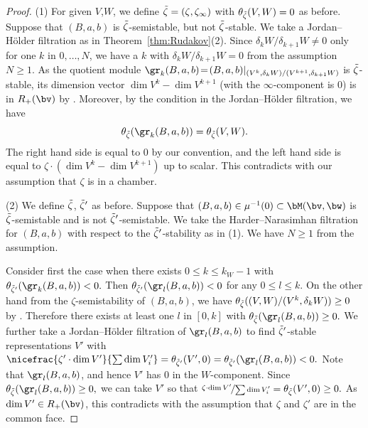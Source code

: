 \begin{proof}
(1) For given $V$,$W$, we def\/ine $\Tilde\zeta=(\zeta,\zeta_\infty)$
with $\theta_{\Tilde\zeta}(V,W) = 0$ as before.
%
Suppose that $(B,a,b)$ is $\Tilde\zeta$-semistable, but not
$\Tilde\zeta$-stable. We take a Jordan--H\"older f\/iltration as in
Theo\-rem~\ref{thm:Rudakov}(2). Since $\delta_k W/\delta_{k+1} W \neq 0$ only
for one $k$ in $0,\dots, N$, we have a $k$ with $\delta_k
W/\delta_{k+1} W = 0$ from the assumption $N\ge 1$. As the quotient
module $\gr_k(B,a,b)\! =\! (B,a,b)|_{(V^k,\delta_k
  W)/\linebreak[2](V^{k+1}, \delta_{k+1} W)}$ is
$\Tilde\zeta$-stable, its dimension vector $\dim V^k - \dim V^{k+1}$
(with the $\infty$-component is $0$) is in $R_+(\bv)$ by
. Moreover, by the condition in the Jordan--H\"older
f\/iltration, we have
\[
  \theta_{\Tilde\zeta}(\gr_k(B,a,b)) = \theta_{\Tilde\zeta}(V,W).
\]
The right hand side is equal to $0$ by our convention, and the left
hand side is equal to $\zeta\cdot(\dim V^k - \dim V^{k+1})$ up to
scalar. This contradicts with our assumption that $\zeta$ is in a chamber.

(2) We def\/ine $\Tilde\zeta$, $\Tilde\zeta'$ as before.
%
Suppose that $(B,a,b)\in\mu^{-1}(0)\subset \bM(\bv,\bw)$ is
$\Tilde\zeta$-semistable and is not $\Tilde\zeta'$-semistable.
We take the Harder--Narasimhan f\/iltration for $(B,a,b)$ with respect to
the $\Tilde\zeta'$-stability as in (1). We have
$N\ge 1$ from the assumption.

Consider f\/irst the case when there exists $0\le k\le k_W - 1$ with
\(
   \theta_{\Tilde\zeta'}(\gr_k(B,a,b)) < 0.
\)
Then
\(
   \theta_{\Tilde\zeta'}(\gr_l(B,a,b)) < 0
\)
for any $0\le l\le k$.
%
On the other hand from the $\zeta$-semistability of $(B,a,b)$, we have
\(
   \theta_{\Tilde\zeta}((V,W)/(V^{k},\delta_{k} W)) \ge 0
\)
by .
Therefore there exists at least one $l$ in $[0, k]$ with
\(
   \theta_{\Tilde\zeta}(\gr_l(B,a,b)) \ge 0.
\)
%
We further take a Jordan--H\"older f\/iltration of $\gr_l(B,a,b)$ to f\/ind
$\Tilde\zeta'$-stable representations $V'$ with
\(
  \nicefrac{\zeta'\cdot\dim V'}{\sum \dim V'_i} =
  \theta_{\Tilde\zeta'}(V',0) = \theta_{\Tilde\zeta'}(\gr_l(B,a,b)) < 0.
\)
Note that $\gr_l(B,a,b)$, and hence $V'$ has $0$ in
the $W$-component.
%
Since
\(
   \theta_{\Tilde\zeta}(\gr_l(B,a,b)) \ge 0,
\)
we can take $V'$ so that
\(
    \nicefrac{\zeta\cdot\dim V'}{\sum \dim V'_i}
    = \theta_{\Tilde\zeta}(V',0) \ge 0.
\)
As $\dim V'\in R_+(\bv)$, this contradicts with the assumption that
$\zeta$ and $\zeta'$ are in the common face.


\end{proof}
